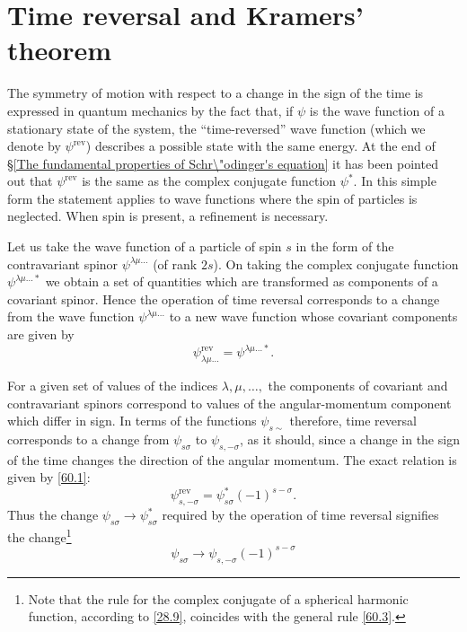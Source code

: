 \section{Time reversal and Kramers’ theorem}\label{Time reversal and Kramers’ theorem}
The symmetry of motion with respect to a change in the sign of the time is expressed in quantum mechanics by the fact that, if $\psi$ is the wave function of a stationary state of the system, the “time-reversed” wave function (which we denote by $\psi^{\mathrm{rev}}$) describes a possible state with the same energy. At the end of \S\ref{The fundamental properties of Schr\"odinger's equation} it has been pointed out that $ \psi^{\mathrm{rev}} $ is the same as the complex conjugate function $ \psi^* $. In this simple form the statement applies to wave functions where the spin of particles is neglected. When spin is present, a refinement is necessary.

Let us take the wave function of a particle of spin $ s $ in the form of the contravariant spinor $ \psi^{\lambda\mu\dots} $ (of rank $ 2s $). On taking the complex conjugate function $ \psi^{\lambda\mu\dots*} $ we obtain a set of quantities which are transformed as components of a covariant spinor. Hence the operation of time reversal corresponds to a change from the wave function $\psi^{\lambda\mu\dots}$ to a new wave function whose covariant components are given by
\begin{equation}\label{60.1}
\psi^{\mathrm{rev}}_{\lambda\mu\dots}=\psi^{\lambda\mu\dots*}.
\end{equation}


For a given set of values of the indices $ \lambda, \mu, \dots, $ the components of covariant and contravariant spinors correspond to values of the angular-momentum component which differ in sign. In terms of the functions $\psi_{s\sim}$ therefore, time reversal corresponds to a change from $\psi_{s\sigma}$ to $ \psi_{s,-\sigma} $, as it should, since a change in the sign of the time changes the direction of the angular momentum. The exact relation is given by \eqref{60.1}:
\begin{equation}\label{60.2}
\psi^{\mathrm{rev}}_{s,-\sigma}=\psi^*_{s\sigma}(-1)^{s-\sigma}.
\end{equation}
Thus the change $ \psi_{s\sigma}\to\psi_{s\sigma}^* $ required by the operation of time reversal signifies the change\footnote{Note that the rule for the complex conjugate of a spherical harmonic function, according to \eqref{28.9}, coincides with the general rule \eqref{60.3}.
}
\begin{equation}\label{60.3}
\psi_{s\sigma}\to\psi_{s,-\sigma}(-1)^{s-\sigma}
\end{equation}


